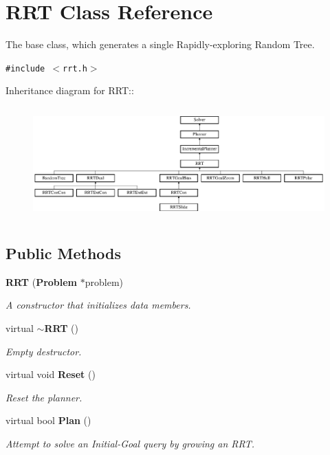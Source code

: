 \section{RRT  Class Reference}
\label{class_RRT}
The base class, which generates a single Rapidly-exploring Random Tree. 


{\tt \#include $<$rrt.h$>$}

Inheritance diagram for RRT::\begin{figure}[H]
\begin{center}
\leavevmode
\includegraphics[height=4.34109cm]{class_RRT}
\end{center}
\end{figure}
\subsection*{Public Methods}
\begin{CompactItemize}
\item 
{\bf RRT} ({\bf Problem} $\ast$problem)
\begin{CompactList}\small\item\em A constructor that initializes data members.\item\end{CompactList}\item 
virtual {\bf $\sim$RRT} ()
\begin{CompactList}\small\item\em Empty destructor.\item\end{CompactList}\item 
virtual void {\bf Reset} ()
\begin{CompactList}\small\item\em Reset the planner.\item\end{CompactList}\item 
virtual bool {\bf Plan} ()
\begin{CompactList}\small\item\em Attempt to solve an Initial-Goal query by growing an RRT.\item\end{CompactList}\end{CompactItemize}
